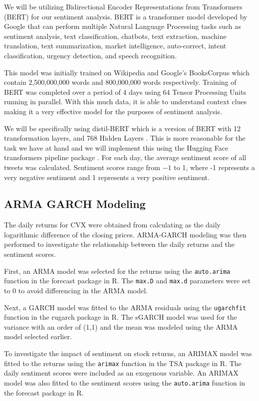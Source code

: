 \documentclass[12pt, letterpaper, titlepage]{article}
\newcommand{\jy}[1]{\textcolor{blue}{JY: #1}}
\begin{document}
We will be utilizing Bidirectional Encoder Representations from Transformers (BERT) for our sentiment analysis. BERT is a transformer model developed by Google that can perform multiple Natural Language Processing tasks such as sentiment analysis, text classification, chatbots, text extraction, machine translation, text summarization, market intelligence, auto-correct, intent classification, urgency detection, and speech recognition.


This model was initially trained on Wikipedia and Google’s BooksCorpus which contain 2,500,000,000 words and 800,000,000 words respectively. Training of BERT was completed over a period of 4 days using 64 Tensor Processing Units running in parallel. With this much data, it is able to understand context clues making it a very effective model for the purposes of sentiment analysis.


We will be specifically using distil-BERT which is a version of BERT with 12 transformation layers, and 768 Hidden Layers \citep{muller_2022}. This is more reasonable for the task we have at hand and we will implement this using the Hugging Face transformers pipeline package \citep{huggingface2023}. For each day, the average sentiment score of all tweets was calculated. Sentiment scores range from $-1$ to 1, where -1 represents a very negative sentiment and 1 represents a very positive sentiment.

\subsection{ARMA GARCH Modeling}
The daily returns for CVX were obtained from calculating as the daily logarithmic difference of the closing prices. ARMA-GARCH modeling was then performed to investigate the relationship between the daily returns and the sentiment scores.

First, an ARMA model was selected for the returns using the \texttt{auto.arima} function in the forecast package in R. The \texttt{max.D} and \texttt{max.d} parameters were set to 0 to avoid differencing in the ARMA model.

Next, a GARCH model was fitted to the ARMA residuals using the \texttt{ugarchfit} function in the rugarch package in R. The sGARCH model was used for the variance with an order of (1,1) and the mean was modeled using the ARMA model selected earlier.

To investigate the impact of sentiment on stock returns, an ARIMAX model was fitted to the returns using the \texttt{arimax} function in the TSA package in R. The daily sentiment scores were included as an exogenous variable. An ARIMAX model was also fitted to the sentiment scores using the \texttt{auto.arima} function in the forecast package in R.
\end{document}
